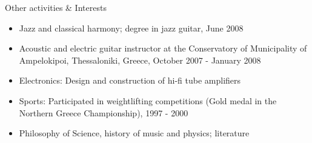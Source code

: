 \documentclass[10pt]{article} %
\newenvironment{outerlist}[1][\enskip\textbullet]%
        {\begin{itemize}[#1]}{\end{itemize}%
         \vspace{-.6\baselineskip}}
\begin{document}
\begin{section}{Other activities \& Interests}
\begin{outerlist}

\item \vskip -7mm 
Jazz and classical harmony; degree in jazz guitar, June 2008
\item Acoustic and electric guitar instructor at the Conservatory 
of Municipality of Ampelokipoi, Thessaloniki, Greece, October 2007 - January 2008
\item Electronics: Design and construction of hi-fi tube amplifiers
\item Sports: Participated in weightlifting competitions (Gold medal in the 
Northern Greece Championship), 1997 - 2000
\item Philosophy of Science, history of music and physics; literature
\end{outerlist}

\end{section}


\end{document}
